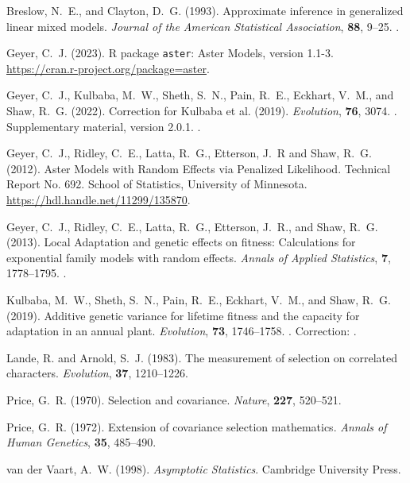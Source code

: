 \documentclass[11pt]{article}
\begin{document}
\begin{thebibliography}{}

Breslow, N.~E., and Clayton, D.~G. (1993).
\newblock Approximate inference in generalized linear mixed models.
\newblock \emph{Journal of the American Statistical Association},
    \textbf{88}, 9--25.
\newblock {}.

Geyer, C.~J. (2023).
\newblock R package \texttt{aster}: Aster Models, version 1.1-3.
\newblock \url{https://cran.r-project.org/package=aster}.

Geyer, C.~J., Kulbaba, M.~W., Sheth, S.~N., Pain, R.~E., Eckhart, V.~M.,
    and Shaw, R.~G. (2022).
\newblock Correction for Kulbaba et al. (2019).
\newblock \emph{Evolution}, \textbf{76}, 3074.
\newblock {}.
\newblock Supplementary material, version 2.0.1.
\newblock {}.

Geyer, C.~J., Ridley, C.~E., Latta, R.~G., Etterson, J.~R and Shaw, R.~G.
    (2012).
\newblock Aster Models with Random Effects via Penalized Likelihood.
\newblock Technical Report No. 692.  School of Statistics,
    University of Minnesota.
\newblock \url{https://hdl.handle.net/11299/135870}.

Geyer, C.~J., Ridley, C.~E., Latta, R.~G., Etterson, J.~R., and Shaw, R.~G.
    (2013).
\newblock Local Adaptation and genetic effects on fitness: Calculations for
    exponential family models with random effects.
\newblock \emph{Annals of Applied Statistics}, \textbf{7}, 1778--1795.
\newblock {}.

Kulbaba, M.~W., Sheth, S.~N., Pain, R.~E., Eckhart, V.~M., and
    Shaw, R.~G. (2019).
\newblock Additive genetic variance for lifetime fitness and the capacity
    for adaptation in an annual plant.
\newblock \emph{Evolution}, \textbf{73}, 1746--1758.
\newblock {}.
\newblock Correction: \citet{zenodo}.

Lande, R. and Arnold, S.~J. (1983).
\newblock The measurement of selection on correlated characters.
\newblock \emph{Evolution}, \textbf{37}, 1210--1226.

Price, G.~R. (1970).
\newblock Selection and covariance.
\newblock \emph{Nature}, \textbf{227}, 520--521.

Price, G.~R. (1972).
\newblock Extension of covariance selection mathematics.
\newblock \emph{Annals of Human Genetics}, \textbf{35}, 485--490.

van der Vaart, A.~W. (1998).
\newblock \emph{Asymptotic Statistics}.
\newblock Cambridge University Press.

\end{thebibliography}
\end{document}
